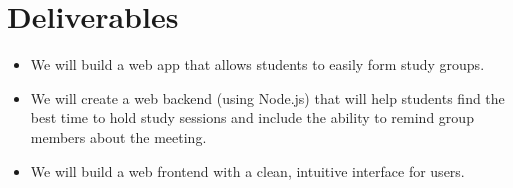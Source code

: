 \documentclass[12pt]{article}
\begin{document}
\section{Deliverables}
\begin{itemize}[nolistsep]
    \item We will build a web app that allows students to easily form study groups.
    \item We will create a web backend (using Node.js) that will help students find the best time to hold study sessions and include the ability to remind group members about the meeting.
    \item We will build a web frontend with a clean, intuitive interface for users.
\end{itemize}
\end{document}

